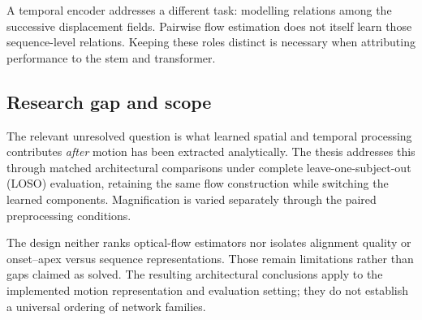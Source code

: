 A temporal encoder addresses a different task: modelling relations among the successive displacement fields. Pairwise flow estimation does not itself learn those sequence-level relations. Keeping these roles distinct is necessary when attributing performance to the stem and transformer.

\subsection{Research gap and scope}
\label{sec:flow-gap}

The relevant unresolved question is what learned spatial and temporal processing contributes \textit{after} motion has been extracted analytically. The thesis addresses this through matched architectural comparisons under complete leave-one-subject-out (LOSO) evaluation, retaining the same flow construction while switching the learned components. Magnification is varied separately through the paired preprocessing conditions.

The design neither ranks optical-flow estimators nor isolates alignment quality or onset--apex versus sequence representations. Those remain limitations rather than gaps claimed as solved. The resulting architectural conclusions apply to the implemented motion representation and evaluation setting; they do not establish a universal ordering of network families.
